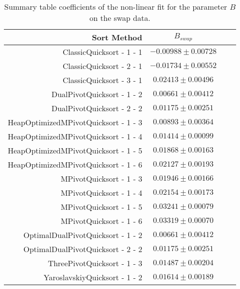 		\begin{table}
			\begin{center}
				\begin{tabular}{|r|c|c|c}
					\hline
									Sort Method              &   $B_{swap}$      \\ \hline \hline
					                ClassicQuicksort - 1 - 1 &   $ -0.00988 \pm  0.00728$ \\ \hline
					                ClassicQuicksort - 2 - 1 &   $ -0.01734 \pm  0.00552$ \\ \hline
					                ClassicQuicksort - 3 - 1 &   $  0.02413 \pm  0.00496$ \\ \hline
					              DualPivotQuicksort - 1 - 2 &   $  0.00661 \pm  0.00412$ \\ \hline
					              DualPivotQuicksort - 2 - 2 &   $  0.01175 \pm  0.00251$ \\ \hline
					    HeapOptimizedMPivotQuicksort - 1 - 3 &   $  0.00893 \pm  0.00364$ \\ \hline
					    HeapOptimizedMPivotQuicksort - 1 - 4 &   $  0.01414 \pm  0.00099$ \\ \hline
					    HeapOptimizedMPivotQuicksort - 1 - 5 &   $  0.01868 \pm  0.00163$ \\ \hline
					    HeapOptimizedMPivotQuicksort - 1 - 6 &   $  0.02127 \pm  0.00193$ \\ \hline
					                 MPivotQuicksort - 1 - 3 &   $  0.01946 \pm  0.00166$ \\ \hline
					                 MPivotQuicksort - 1 - 4 &   $  0.02154 \pm  0.00173$ \\ \hline
					                 MPivotQuicksort - 1 - 5 &   $  0.03241 \pm  0.00079$ \\ \hline
					                 MPivotQuicksort - 1 - 6 &   $  0.03319 \pm  0.00070$ \\ \hline
					       OptimalDualPivotQuicksort - 1 - 2 &   $  0.00661 \pm  0.00412$ \\ \hline
					       OptimalDualPivotQuicksort - 2 - 2 &   $  0.01175 \pm  0.00251$ \\ \hline
					             ThreePivotQuicksort - 1 - 3 &   $  0.01487 \pm  0.00204$ \\ \hline
					           YaroslavskiyQuicksort - 1 - 2 &   $  0.01614 \pm  0.00189$ \\ \hline
				\end{tabular}
				\caption{Summary table coefficients of the non-linear fit for the parameter $B$ on the swap data.}
				\label{tab:swapFitCoeffB}
			\end{center}
		\end{table}

